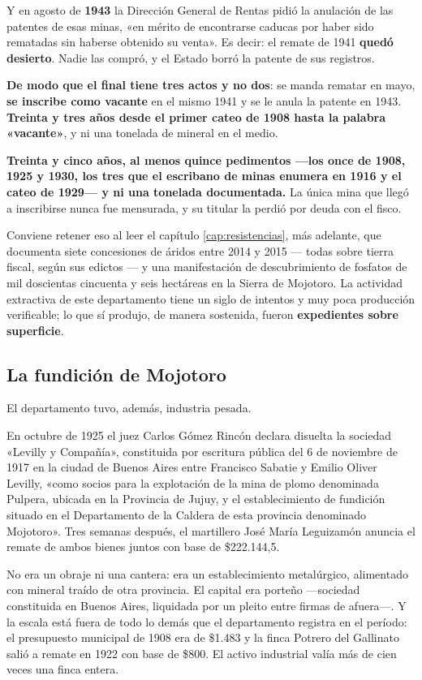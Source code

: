 Y en agosto de \textbf{1943} la Dirección General de Rentas pidió la anulación de las patentes
de esas minas, «en mérito de encontrarse caducas por haber sido rematadas sin haberse
obtenido su venta». Es decir: el remate de 1941 \textbf{quedó desierto}. Nadie las compró, y
el Estado borró la patente de sus registros.

\textbf{De modo que el final tiene tres actos y no dos}: se manda rematar en mayo, \textbf{se inscribe
como vacante} en el mismo 1941 y se le anula la patente en 1943. \textbf{Treinta y tres años
desde el primer cateo de 1908 hasta la palabra «vacante»}, y ni una tonelada de mineral en el
medio.

\textbf{Treinta y cinco años, al menos quince pedimentos ---los once de 1908, 1925 y 1930, los tres que el escribano de minas enumera en 1916 y el cateo de 1929--- y ni una tonelada documentada.} La única mina
que llegó a inscribirse nunca fue mensurada, y su titular la perdió por deuda con el fisco.

Conviene retener eso al leer el capítulo \ref{cap:resistencias}, más adelante, que documenta siete concesiones de áridos entre 2014 y 2015 --- todas sobre tierra fiscal, según sus edictos --- y una manifestación de descubrimiento de
fosfatos de mil doscientas cincuenta y seis hectáreas en la Sierra de Mojotoro. La actividad
extractiva de este departamento tiene un siglo de intentos y muy poca producción verificable;
lo que sí produjo, de manera sostenida, fueron \textbf{expedientes sobre superficie}.

\subsection*{La fundición de Mojotoro}

El departamento tuvo, además, industria pesada.

En octubre de 1925 el juez Carlos Gómez Rincón declara disuelta la sociedad «Levilly y
Compañía», constituida por escritura pública del 6 de noviembre de 1917 en la ciudad de
Buenos Aires entre Francisco Sabatie y Emilio Oliver Levilly, «como socios para la
explotación de la mina de plomo denominada Pulpera, ubicada en la Provincia de Jujuy, y el
establecimiento de fundición situado en el Departamento de la Caldera de esta provincia
denominado Mojotoro». Tres semanas después, el martillero José María Leguizamón anuncia el
remate de ambos bienes juntos con base de \$222.144,5.

No era un obraje ni una cantera: era un establecimiento metalúrgico, alimentado con mineral
traído de otra provincia. El capital era porteño —sociedad constituida en Buenos Aires,
liquidada por un pleito entre firmas de afuera—. Y la escala está fuera de todo lo demás
que el departamento registra en el período: el presupuesto municipal de 1908 era de \$1.483
y la finca Potrero del Gallinato salió a remate en 1922 con base de \$800. El activo industrial
valía más de cien veces una finca entera.

